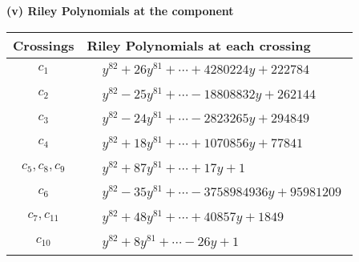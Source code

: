 \documentclass[1p]{elsarticle_modified}
\theoremstyle{definition}
\begin{document}
\newpage\renewcommand{\arraystretch}{1}
\flushleft \textbf{(v) Riley Polynomials at the component}\newline \\
\begin{tabular}{m{50pt}|m{274pt}}
Crossings & \hspace{64pt}Riley Polynomials at each crossing \\
\hline $$\begin{aligned}c_{1}\end{aligned}$$&$\begin{aligned}
&y^{82}+26 y^{81}+\cdots+4280224 y+222784
\end{aligned}$\\
\hline $$\begin{aligned}c_{2}\end{aligned}$$&$\begin{aligned}
&y^{82}-25 y^{81}+\cdots-18808832 y+262144
\end{aligned}$\\
\hline $$\begin{aligned}c_{3}\end{aligned}$$&$\begin{aligned}
&y^{82}-24 y^{81}+\cdots-2823265 y+294849
\end{aligned}$\\
\hline $$\begin{aligned}c_{4}\end{aligned}$$&$\begin{aligned}
&y^{82}+18 y^{81}+\cdots+1070856 y+77841
\end{aligned}$\\
\hline $$\begin{aligned}c_{5},c_{8},c_{9}\end{aligned}$$&$\begin{aligned}
&y^{82}+87 y^{81}+\cdots+17 y+1
\end{aligned}$\\
\hline $$\begin{aligned}c_{6}\end{aligned}$$&$\begin{aligned}
&y^{82}-35 y^{81}+\cdots-3758984936 y+95981209
\end{aligned}$\\
\hline $$\begin{aligned}c_{7},c_{11}\end{aligned}$$&$\begin{aligned}
&y^{82}+48 y^{81}+\cdots+40857 y+1849
\end{aligned}$\\
\hline $$\begin{aligned}c_{10}\end{aligned}$$&$\begin{aligned}
&y^{82}+8 y^{81}+\cdots-26 y+1
\end{aligned}$\\
\hline
\end{tabular}\\~\\
\end{document}
